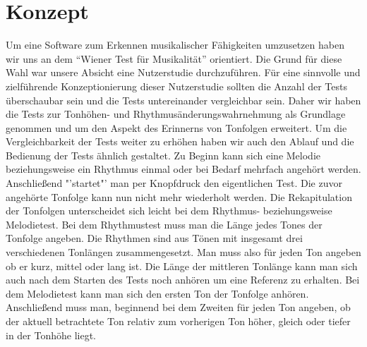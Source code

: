 \documentclass{acm_proc_article-sp}
\begin{document}
\section{Konzept}
Um eine Software zum Erkennen musikalischer Fähigkeiten umzusetzen haben wir uns an dem "`Wiener Test für Musikalität"' orientiert.
Die Grund für diese Wahl war unsere Absicht eine Nutzerstudie durchzuführen. Für eine sinnvolle und zielführende Konzeptionierung dieser Nutzerstudie sollten die Anzahl der Tests überschaubar sein und die Tests untereinander vergleichbar sein.
Daher wir haben die Tests zur Tonhöhen- und Rhythmusänderungswahrnehmung als Grundlage genommen und um den Aspekt des Erinnerns von Tonfolgen erweitert.
Um die Vergleichbarkeit der Tests weiter zu erhöhen haben wir auch den Ablauf und die Bedienung der Tests ähnlich gestaltet.
Zu Beginn kann sich eine Melodie beziehungsweise ein Rhythmus einmal oder bei Bedarf mehrfach angehört werden. Anschließend "'startet"' man per Knopfdruck den eigentlichen Test. Die zuvor angehörte Tonfolge kann nun nicht mehr wiederholt werden. Die Rekapitulation der Tonfolgen unterscheidet sich leicht bei dem Rhythmus- beziehungsweise Melodietest. Bei dem Rhythmustest muss man die Länge jedes Tones der Tonfolge angeben. Die Rhythmen sind aus Tönen mit insgesamt drei verschiedenen Tonlängen zusammengesetzt. Man muss also für jeden Ton angeben ob er kurz, mittel oder lang ist. Die Länge der mittleren Tonlänge kann man sich auch nach dem Starten des Tests noch anhören um eine Referenz zu erhalten.
Bei dem Melodietest kann man sich den ersten Ton der Tonfolge anhören. Anschließend muss man, beginnend bei dem Zweiten für jeden Ton angeben, ob der aktuell betrachtete Ton relativ zum vorherigen Ton höher, gleich oder tiefer in der Tonhöhe liegt.
\end{document}
